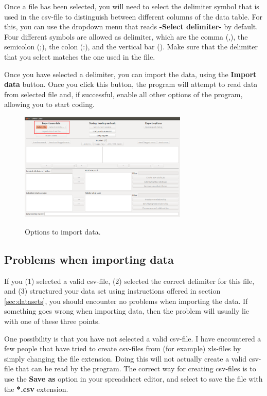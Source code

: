 \documentclass{memoir}
\begin{document}
Once a file has been selected, you will need to select the delimiter symbol that is used in the csv-file to distinguish between different columns of the data table. For this, you can use the dropdown menu that reads \textbf{-Select delimiter-} by default. Four different symbols are allowed as delimiter, which are the comma (,), the semicolon (;), the colon (:), and the vertical bar (\textbar). Make sure that the delimiter that you select matches the one used in the file.

Once you have selected a delimiter, you can import the data, using the \textbf{Import data} button. Once you click this button, the program will attempt to read data from selected file and, if successful, enable all other options of the program, allowing you to start coding.   

\begin{figure}[h!]
  \centering
  \caption{Options to import data.}
  \includegraphics[width=80mm]{Screenshot_0.pdf}
  \label{fig:importoptions}
\end{figure}

\subsection{Problems when importing data}
\label{sec:importerrors}

If you (1) selected a valid csv-file, (2) selected the correct delimiter for this file, and (3) structured your data set using instructions offered in section \ref{sec:datasets}, you should encounter no problems when importing the data. If something goes wrong when importing data, then the problem will usually lie with one of these three points.

One possibility is that you have not selected a valid csv-file. I have encountered a few people that have tried to create csv-files from (for example) xls-files by simply changing the file extension. Doing this will not actually create a valid csv-file that can be read by the program. The correct way for creating csv-files is to use the \textbf{Save as} option in your spreadsheet editor, and select to save the file with the \textbf{*.csv} extension.
\end{document}
